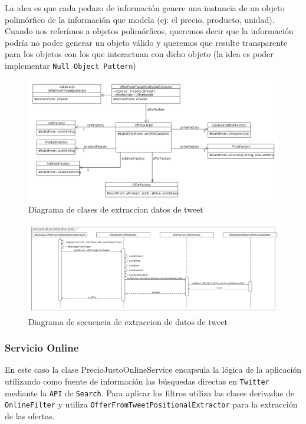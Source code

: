La idea es que cada pedazo de informaci\'on genere una instancia de un objeto polim\'orfico de la informaci\'on que modela (ej: el precio, producto, unidad).
Cuando nos refer\'imos a objetos polim\'orficos, queremos decir que la informaci\'on podr\'ia no poder generar un objeto v\'alido y queremos que resulte transparente para los objetos con los que interactuan con dicho objeto (la idea es poder implementar \texttt{Null Object Pattern})

\begin{figure}[h]
\centerline{\includegraphics[width=\textwidth]{./imgs/class_diagram_parsing.png}}
\caption{Diagrama de clases de extraccion datos de tweet}
\label{fig:class_parsing}
\end{figure}

\begin{figure}[h]
\centerline{\includegraphics[width=\textwidth]{./imgs/sequence_diagram_parsing.png}}
\caption{Diagrama de secuencia de extraccion de datos de tweet}
\label{fig:secuence_parsing}
\end{figure}

\subsubsection{Servicio Online}
En este caso la clase PrecioJustoOnlineService encapsula la l\'ogica de la aplicaci\'on utilizando como fuente de informaci\'on las b\'usquedas directas en \texttt{Twitter} mediante la \texttt{API} de \texttt{Search}.
Para aplicar los filtros utiliza las clases derivadas de \texttt{OnlineFilter} y utiliza \texttt{OfferFromTweetPositionalExtractor} para la extracci\'on de las ofertas.

